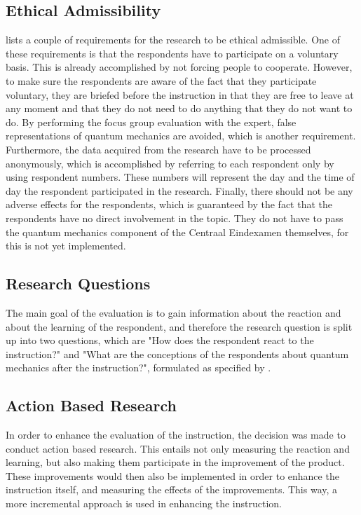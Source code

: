 \documentclass[11pt,twoside]{report} %
\begin{document}
\subsection{Ethical Admissibility}

 lists a couple of requirements for the research to be ethical admissible. One of these requirements is that the respondents have to participate on a voluntary basis. This is already accomplished by not forcing people to cooperate. However, to make sure the respondents are aware of the fact that they participate voluntary, they are briefed before the instruction in that they are free to leave at any moment and that they do not need to do anything that they do not want to do. By performing the focus group evaluation with the expert, false representations of quantum mechanics are avoided, which is another requirement. Furthermore, the data acquired from the research have to be processed anonymously, which is accomplished by referring to each respondent only by using respondent numbers. These numbers will represent the day and the time of day the respondent participated in the research. Finally, there should not be any adverse effects for the respondents, which is guaranteed by the fact that the respondents have no direct involvement in the topic. They do not have to pass the quantum mechanics component of the Centraal Eindexamen themselves, for this is not yet implemented.

\subsection{Research Questions}

The main goal of the evaluation is to gain information about the reaction and about the learning of the respondent, and therefore the research question is split up into two questions, which are "How does the respondent react to the instruction?" and "What are the conceptions of the respondents about quantum mechanics after the instruction?", formulated as specified by .

\subsection{Action Based Research}

In order to enhance the evaluation of the instruction, the decision was made to conduct action based research. This entails not only measuring the reaction and learning, but also making them participate in the improvement of the product. These improvements would then also be implemented in order to enhance the instruction itself, and measuring the effects of the improvements. This way, a more incremental approach is used in enhancing the instruction.
\end{document}
